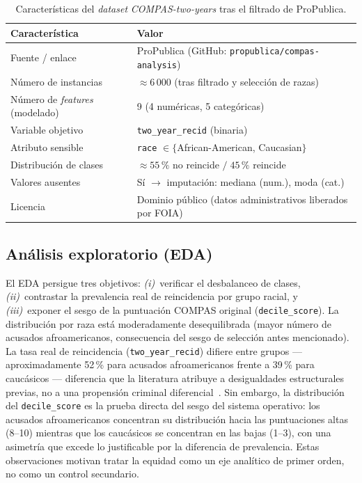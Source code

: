\documentclass[11pt,a4paper]{article}
\begin{document}
\begin{table}[H]
\centering
\caption{Características del \textit{dataset} \textit{COMPAS-two-years} tras el filtrado de ProPublica.}
\label{tab:dataset}
\small
\begin{tabular}{@{}ll@{}}
\toprule
\textbf{Característica} & \textbf{Valor} \\
\midrule
Fuente / enlace           & ProPublica (GitHub: \texttt{propublica/compas-analysis}) \\
Número de instancias      & $\approx 6\,000$ (tras filtrado y selección de razas) \\
Número de \textit{features} (modelado) & 9 (4 numéricas, 5 categóricas)\\
Variable objetivo         & \texttt{two\_year\_recid} (binaria) \\
Atributo sensible         & \texttt{race} $\in\{$African-American, Caucasian$\}$ \\
Distribución de clases    & $\approx 55\,\%$ no reincide $/\;45\,\%$ reincide \\
Valores ausentes          & Sí $\to$ imputación: mediana (num.), moda (cat.) \\
Licencia                  & Dominio público (datos administrativos liberados por FOIA) \\
\bottomrule
\end{tabular}
\end{table}

\subsection{Análisis exploratorio (EDA)}

El EDA persigue tres objetivos: \emph{(i)}~verificar el desbalanceo de clases, \emph{(ii)}~contrastar la prevalencia real de reincidencia por grupo racial, y \emph{(iii)}~exponer el sesgo de la puntuación COMPAS original (\texttt{decile\_score}). La distribución por raza está moderadamente desequilibrada (mayor número de acusados afroamericanos, consecuencia del sesgo de selección antes mencionado). La tasa real de reincidencia (\texttt{two\_year\_recid}) difiere entre grupos --- aproximadamente 52\,\% para acusados afroamericanos frente a 39\,\% para caucásicos --- diferencia que la literatura atribuye a desigualdades estructurales previas, no a una propensión criminal diferencial~\cite{barocas2019fairness}. Sin embargo, la distribución del \texttt{decile\_score} es la prueba directa del sesgo del sistema operativo: los acusados afroamericanos concentran su distribución hacia las puntuaciones altas (8--10) mientras que los caucásicos se concentran en las bajas (1--3), con una asimetría que excede lo justificable por la diferencia de prevalencia. Estas observaciones motivan tratar la equidad como un eje analítico de primer orden, no como un control secundario.
\end{document}
